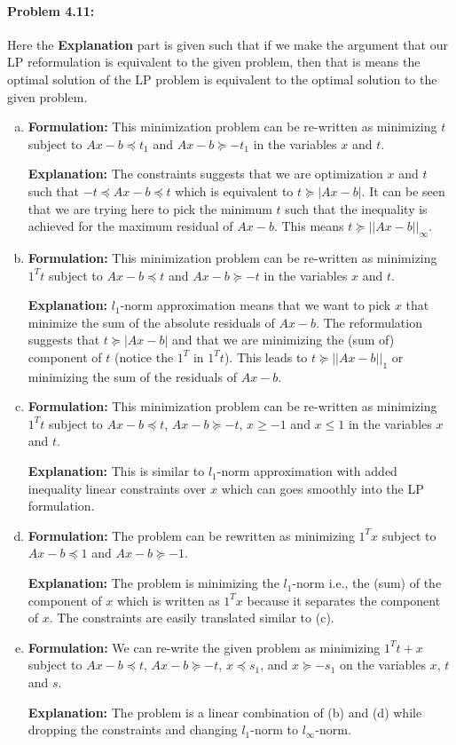 \documentclass[12pt] {article}
\begin{document}
\paragraph{Problem 4.11:} 
Here the \textbf{Explanation} part is given such that if we make the argument that our LP reformulation is equivalent to the given problem, then that is means the optimal solution of the LP problem is equivalent to the optimal solution to the given problem. 
\begin{enumerate}[(a)]
\item \textbf{Formulation:} This minimization problem can be re-written as minimizing $t$ subject to $Ax-b \preceq t_1$ and $Ax-b \succeq -t_1$ in the variables $x$ and $t$. 

\textbf{Explanation:} The constraints suggests that we are optimization $x$ and $t$ such that $-t \preceq Ax -b \preceq t $ which is equivalent to $t \succeq |Ax -b|$. It can be seen that we are trying here to pick the minimum $t$ such that the inequality is achieved for the maximum residual of $Ax - b$. This means $t \succeq ||Ax -b||_{\infty}$. 

\item \textbf{Formulation:} This minimization problem can be re-written as minimizing $1^{T}t$ subject to $Ax-b \preceq t$ and $Ax-b \succeq -t$ in the variables $x$ and $t$. 

\textbf{Explanation:} $l_{1}$-norm approximation means that we want to pick $x$ that minimize the sum of the absolute residuals of $Ax - b$. The reformulation suggests that $t \succeq |Ax -b|$ and that we are minimizing the (sum of) component of $t$ (notice the $1^{T}$ in $1^{T}t$). This leads to $t \succeq ||Ax -b||_{1}$ or minimizing the sum of the residuals of $Ax-b$. 

\item \textbf{Formulation:} This minimization problem can be re-written as minimizing $1^{T}t$ subject to $Ax-b \preceq t$, $Ax-b \succeq -t$, $x \geq -1 $ and $x \leq 1 $ in the variables $x$ and $t$. 

\textbf{Explanation:} This is similar to $l_{1}$-norm approximation with added inequality linear constraints over $x$ which can goes smoothly into the LP formulation. 

\item \textbf{Formulation:} The problem can be rewritten as minimizing $1^{T}x$ subject to $Ax-b \preceq 1$ and $Ax-b \succeq -1$. 

\textbf{Explanation:} The problem is minimizing the $l_{1}$-norm i.e., the (sum) of the component of $x$ which is written as $1^{T}x$ because it separates the component of $x$. The constraints are easily translated similar to (c). 

\item \textbf{Formulation:} We can re-write the given problem as minimizing $1^{T}t + x$ subject to $Ax-b \preceq t$, $Ax-b \succeq -t$, $x \preceq s_1$, and $x \succeq -s_1$ on the variables $x$, $t$ and $s$.

\textbf{Explanation:} The problem is a linear combination of (b) and (d) while dropping the constraints and changing $l_1$-norm to $l_{\infty}$-norm.


\end{enumerate}
 

\end{document}
